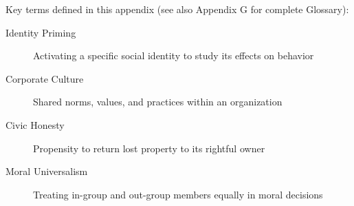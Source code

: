 \begin{tcolorbox}[colback=gray!10!white,colframe=gray!50!black,title=Quick Reference]
Key terms defined in this appendix (see also Appendix G for complete Glossary):
\begin{description}
    \item[Identity Priming] Activating a specific social identity to study its effects on behavior
    \item[Corporate Culture] Shared norms, values, and practices within an organization
    \item[Civic Honesty] Propensity to return lost property to its rightful owner
    \item[Moral Universalism] Treating in-group and out-group members equally in moral decisions
\end{description}
\end{tcolorbox}


